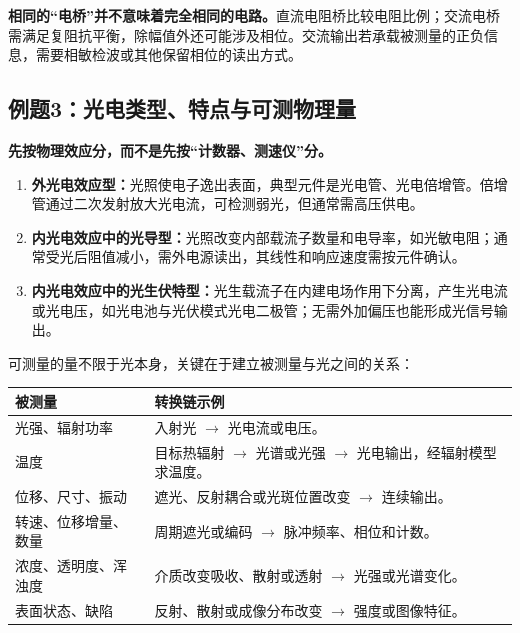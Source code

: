 \textbf{相同的“电桥”并不意味着完全相同的电路。}直流电阻桥比较电阻比例；交流电桥需满足复阻抗平衡，除幅值外还可能涉及相位。交流输出若承载被测量的正负信息，需要相敏检波或其他保留相位的读出方式。


\Needspace{7cm}
\subsection{例题3：光电类型、特点与可测物理量}


\sol
\textbf{先按物理效应分，而不是先按“计数器、测速仪”分。}
\begin{enumerate}
\item \textbf{外光电效应型：}光照使电子逸出表面，典型元件是光电管、光电倍增管。倍增管通过二次发射放大光电流，可检测弱光，但通常需高压供电。
\item \textbf{内光电效应中的光导型：}光照改变内部载流子数量和电导率，如光敏电阻；通常受光后阻值减小，需外电源读出，其线性和响应速度需按元件确认。
\item \textbf{内光电效应中的光生伏特型：}光生载流子在内建电场作用下分离，产生光电流或光电压，如光电池与光伏模式光电二极管；无需外加偏压也能形成光信号输出。
\end{enumerate}

可测量的量不限于光本身，关键在于建立被测量与光之间的关系：
\begin{table}[H]
\centering\small
\begin{tabularx}{\linewidth}{@{}p{3cm} X@{}}
\toprule
被测量 & 转换链示例 \\
\midrule
光强、辐射功率 & 入射光 $\to$ 光电流或电压。 \\
温度 & 目标热辐射 $\to$ 光谱或光强 $\to$ 光电输出，经辐射模型求温度。 \\
位移、尺寸、振动 & 遮光、反射耦合或光斑位置改变 $\to$ 连续输出。 \\
转速、位移增量、数量 & 周期遮光或编码 $\to$ 脉冲频率、相位和计数。 \\
浓度、透明度、浑浊度 & 介质改变吸收、散射或透射 $\to$ 光强或光谱变化。 \\
表面状态、缺陷 & 反射、散射或成像分布改变 $\to$ 强度或图像特征。 \\
\bottomrule
\end{tabularx}
\end{table}


